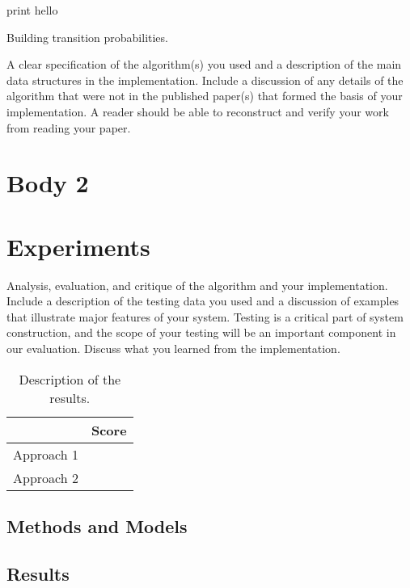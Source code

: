 \documentclass[11pt]{article}
\begin{document}
\begin{algorithm}
  \begin{algorithmic}
        print hello
      \EndFor
    \EndFor
    \EndProcedure{}
  \end{algorithmic}
  \caption{Building transition probabilities.}
\end{algorithm}

A clear specification of the algorithm(s) you used and a description
of the main data structures in the implementation. Include a
discussion of any details of the algorithm that were not in the
published paper(s) that formed the basis of your implementation. A
reader should be able to reconstruct and verify your work from reading
your paper.

\section{Body 2}

\section{Experiments}
Analysis, evaluation, and critique of the algorithm and your
implementation. Include a description of the testing data you used and
a discussion of examples that illustrate major features of your
system. Testing is a critical part of system construction, and the
scope of your testing will be an important component in our
evaluation. Discuss what you learned from the implementation.

\begin{table}
  \centering
  \begin{tabular}{ll}
    \toprule
    & Score \\
    \midrule
    Approach 1 & \\
    Approach 2 & \\
    \bottomrule
  \end{tabular}
  \caption{Description of the results.}
\end{table}

\subsection{Methods and Models}


\subsection{Results}
\end{document}

